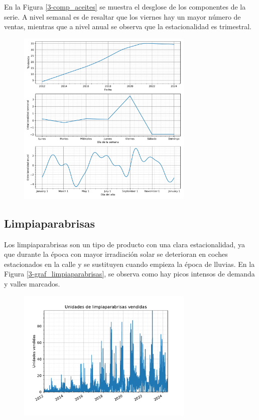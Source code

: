 En la Figura \ref*{3-comp_aceites} se muestra el desglose de los componentes de la serie. A nivel semanal es de resaltar que los viernes hay un mayor número de ventas, mientras que a nivel anual se observa que la estacionalidad es trimestral.

\begin{figure}[H]
	{\includegraphics[width=0.75\textwidth]{imagenes/comps_aceites.pdf}}
\end{figure}

\subsection{Limpiaparabrisas}

Los limpiaparabrisas son un tipo de producto con una clara estacionalidad, ya que durante la época con mayor irradiación solar se deterioran en coches estacionados en la calle y se sustituyen cuando empieza la época de lluvias. En la Figura \ref*{3-graf_limpiaparabrisas}, se observa como hay picos intensos de demanda y valles marcados.

\begin{figure}[H]
	{\includegraphics[width=0.75\textwidth]{imagenes/grafica_limpiaparabrisas.pdf}}
\end{figure}

